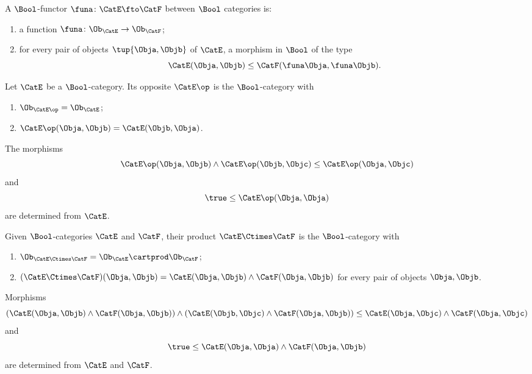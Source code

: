 \begin{ctdefinition}
A $\Bool$-functor $\funa \colon \CatE \fto \CatF$ between $\Bool$ categories is:

\constit
\begin{enumerate}
\item a function $\funa \colon \Ob_\CatE \to \Ob_\CatF$;
\item for every pair of objects $\tup{\Obja, \Objb}$ of $\CatE$, a morphism in $\Bool$ of the type
\begin{equation}
\CatE(\Obja, \Objb) \leq \CatF(\funa \Obja, \funa \Objb). 
\end{equation}
\end{enumerate}
\end{ctdefinition}


\begin{ctdefinition}
Let $\CatE$ be a $\Bool$-category. Its opposite $\CatE\op$ is the $\Bool$-category with 
\begin{enumerate}
\item $\Ob_{\CatE\op} = \Ob_\CatE$;
\item $\CatE\op(\Obja, \Objb) = \CatE(\Objb, \Obja)$.
\end{enumerate}

The morphisms 
\begin{equation}
\CatE\op(\Obja, \Objb) \wedge \CatE\op(\Objb, \Objc) \leq \CatE\op(\Obja, \Objc)
\end{equation}
and
\begin{equation}
\true \leq \CatE\op(\Obja, \Obja)
\end{equation}
are determined from $\CatE$.
\end{ctdefinition}

\begin{ctdefinition}
Given $\Bool$-categories $\CatE$ and $\CatF$, their product $\CatE \Ctimes \CatF$ is the $\Bool$-category with 
\begin{enumerate}
\item $\Ob_{\CatE \Ctimes \CatF} = \Ob_\CatE \cartprod \Ob_\CatF$;
\item $(\CatE \Ctimes \CatF)(\Obja, \Objb) = \CatE (\Obja, \Objb) \wedge \CatF (\Obja, \Objb)$ for every pair of objects $\Obja, \Objb$. 
\end{enumerate}
Morphisms 
\begin{equation}
(\CatE(\Obja, \Objb) \wedge \CatF(\Obja, \Objb)) \wedge (\CatE(\Objb, \Objc) \wedge \CatF(\Obja, \Objb)) \leq \CatE(\Obja, \Objc) \wedge  \CatF(\Obja, \Objc)
\end{equation}
and
\begin{equation}
\true \leq \CatE(\Obja, \Obja) \wedge \CatF(\Obja, \Objb)
\end{equation}
are determined from $\CatE$ and $\CatF$.
\end{ctdefinition}


